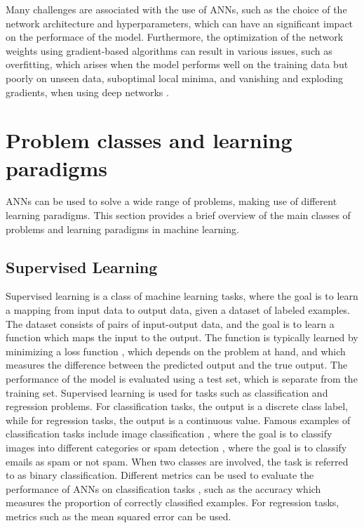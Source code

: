 Many challenges are associated with the use of ANNs, such as the choice of the network architecture and hyperparameters, which can have an significant
impact on the performace of the model. Furthermore, the optimization of the network weights using gradient-based algorithms can result in various issues, such
as overfitting, which arises when the model performs well on the training data but poorly on unseen data, suboptimal local minima, and vanishing and
exploding gradients, when using deep networks \cite{overfitting,vanishing_gradient}.

\section{Problem classes and learning paradigms}

ANNs can be used to solve a wide range of problems, making use of different learning paradigms. This section provides a brief overview of the main classes of
problems and learning paradigms in machine learning.

\subsection{Supervised Learning}

Supervised learning is a class of machine learning tasks, where the goal is to learn a mapping from input data to output data, given a dataset of labeled
examples. The dataset consists of pairs of input-output data, and the goal is to learn a function which maps the input to the output. The function is typically
learned by minimizing a loss function \cite{on_loss,loss_survey}, which depends on the problem at hand, and which measures the difference between the predicted output and
the true output. The performance of the model is evaluated using a test set, which is separate from the training set. Supervised learning is used for tasks such
as classification and regression problems. For classification tasks, the output is a discrete class label, while for regression tasks, the output is a continuous value.
Famous examples of classification tasks include image classification \cite{cnn,cnn_survey}, where the goal is to classify images into different categories or spam detection \cite{spam_survey},
where the goal is to classify emails as spam or not spam. When two classes are involved, the task is referred to as binary classification.
Different metrics can be used to evaluate the performance of ANNs on classification tasks \cite{classification_metrics}, such as the accuracy which measures the proportion of correctly
classified examples. For regression tasks, metrics such as the mean squared error \cite{mse} can be used.


